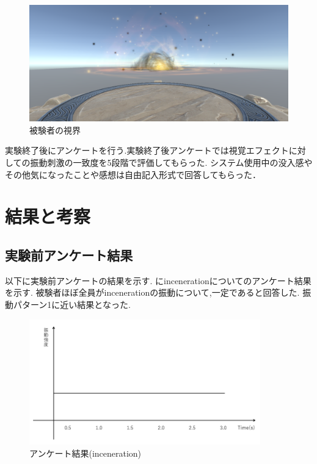 \begin{figure}[h]
\centering
\includegraphics[clip,width=14cm]{./fig/unity.png}
\caption{被験者の視界}\label{first}
\end{figure}

実験終了後にアンケートを行う.実験終了後アンケートでは視覚エフェクトに対しての振動刺激の一致度を5段階で評価してもらった.
システム使用中の没入感やその他気になったことや感想は自由記入形式で回答してもらった．

\newpage

\section{結果と考察}
\subsection{実験前アンケート結果}
以下に実験前アンケートの結果を示す.
にincenerationについてのアンケート結果を示す.
被験者ほぼ全員がincenerationの振動について,一定であると回答した.
振動パターン1に近い結果となった.
\begin{figure}[h]
\centering
\includegraphics[clip,width=10cm]{fig/incenerationAve.png}
\caption{アンケート結果(inceneration)}\label{inceA}
\end{figure}


